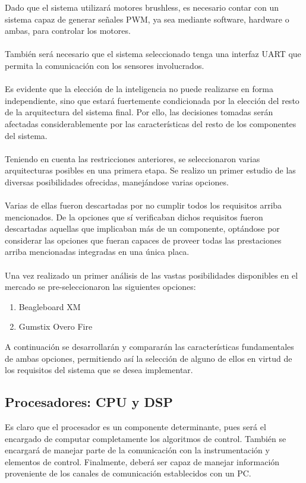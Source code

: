 \documentclass[main]{subfiles}
\begin{document}
Dado que el sistema utilizar\'a motores brushless, es necesario contar con un sistema capaz de generar se\~nales PWM, ya sea mediante software, hardware o ambas, para controlar los motores.\\
\\
Tambi\'en ser\'a necesario que el sistema seleccionado tenga una interfaz UART que permita la comunicaci\'on con los sensores involucrados.\\
\\
Es evidente que la elecci\'on de la inteligencia no puede realizarse en forma independiente, sino que estar\'a fuertemente condicionada por la elecci\'on del resto de la arquitectura del sistema final. Por ello, las decisiones tomadas ser\'an afectadas considerablemente por las caracter\'isticas del resto de los componentes del sistema.\\
\\
Teniendo en cuenta las restricciones anteriores, se seleccionaron varias arquitecturas posibles en una primera etapa. Se realizo un primer estudio de las diversas posibilidades ofrecidas, manej\'andose varias opciones.\\
\\
Varias de ellas fueron descartadas por no cumplir todos los requisitos arriba mencionados. De la opciones que s\'i verificaban dichos requisitos fueron descartadas aquellas que implicaban m\'as de un componente, opt\'andose por considerar las opciones que fueran capaces de proveer todas las prestaciones arriba mencionadas integradas en una \'unica placa.\\
\\
Una vez realizado un primer an\'alisis de las vastas posibilidades disponibles en el mercado se pre-seleccionaron las siguientes opciones:

\begin{enumerate}
\item Beagleboard XM

\item Gumstix Overo Fire
\end{enumerate}
A continuaci\'on se desarrollar\'an y comparar\'an las caracter\'isticas fundamentales de ambas opciones, permitiendo as\'i la selecci\'on de alguno de ellos en virtud de los requisitos del sistema que se desea implementar. 

\subsection*{Procesadores: CPU y DSP}
Es claro que el procesador es un componente determinante, pues ser\'a el encargado de computar completamente los algoritmos de control. Tambi\'en se encargar\'a de manejar parte de la comunicaci\'on con la instrumentaci\'on y elementos de control. Finalmente, deber\'a ser capaz de manejar informaci\'on proveniente de los canales de comunicaci\'on establecidos con un PC.
\end{document}
